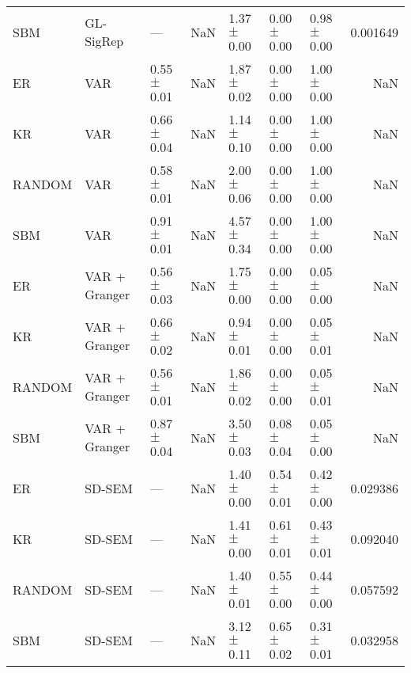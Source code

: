 \begin{tabular}{lllllllr}
SBM & GL-SigRep & --- & NaN & 1.37{\scriptsize$\pm$0.00} & 0.00{\scriptsize$\pm$0.00} & 0.98{\scriptsize$\pm$0.00} & 0.001649 \\
ER & VAR & 0.55{\scriptsize$\pm$0.01} & NaN & 1.87{\scriptsize$\pm$0.02} & 0.00{\scriptsize$\pm$0.00} & 1.00{\scriptsize$\pm$0.00} & NaN \\
KR & VAR & 0.66{\scriptsize$\pm$0.04} & NaN & 1.14{\scriptsize$\pm$0.10} & 0.00{\scriptsize$\pm$0.00} & 1.00{\scriptsize$\pm$0.00} & NaN \\
RANDOM & VAR & 0.58{\scriptsize$\pm$0.01} & NaN & 2.00{\scriptsize$\pm$0.06} & 0.00{\scriptsize$\pm$0.00} & 1.00{\scriptsize$\pm$0.00} & NaN \\
SBM & VAR & 0.91{\scriptsize$\pm$0.01} & NaN & 4.57{\scriptsize$\pm$0.34} & 0.00{\scriptsize$\pm$0.00} & 1.00{\scriptsize$\pm$0.00} & NaN \\
ER & VAR + Granger & 0.56{\scriptsize$\pm$0.03} & NaN & 1.75{\scriptsize$\pm$0.00} & 0.00{\scriptsize$\pm$0.00} & 0.05{\scriptsize$\pm$0.00} & NaN \\
KR & VAR + Granger & 0.66{\scriptsize$\pm$0.02} & NaN & 0.94{\scriptsize$\pm$0.01} & 0.00{\scriptsize$\pm$0.00} & 0.05{\scriptsize$\pm$0.01} & NaN \\
RANDOM & VAR + Granger & 0.56{\scriptsize$\pm$0.01} & NaN & 1.86{\scriptsize$\pm$0.02} & 0.00{\scriptsize$\pm$0.00} & 0.05{\scriptsize$\pm$0.01} & NaN \\
SBM & VAR + Granger & 0.87{\scriptsize$\pm$0.04} & NaN & 3.50{\scriptsize$\pm$0.03} & 0.08{\scriptsize$\pm$0.04} & 0.05{\scriptsize$\pm$0.00} & NaN \\
ER & SD-SEM & --- & NaN & 1.40{\scriptsize$\pm$0.00} & 0.54{\scriptsize$\pm$0.01} & 0.42{\scriptsize$\pm$0.00} & 0.029386 \\
KR & SD-SEM & --- & NaN & 1.41{\scriptsize$\pm$0.00} & 0.61{\scriptsize$\pm$0.01} & 0.43{\scriptsize$\pm$0.01} & 0.092040 \\
RANDOM & SD-SEM & --- & NaN & 1.40{\scriptsize$\pm$0.01} & 0.55{\scriptsize$\pm$0.00} & 0.44{\scriptsize$\pm$0.00} & 0.057592 \\
SBM & SD-SEM & --- & NaN & 3.12{\scriptsize$\pm$0.11} & 0.65{\scriptsize$\pm$0.02} & 0.31{\scriptsize$\pm$0.01} & 0.032958 \\
\bottomrule
\end{tabular}
